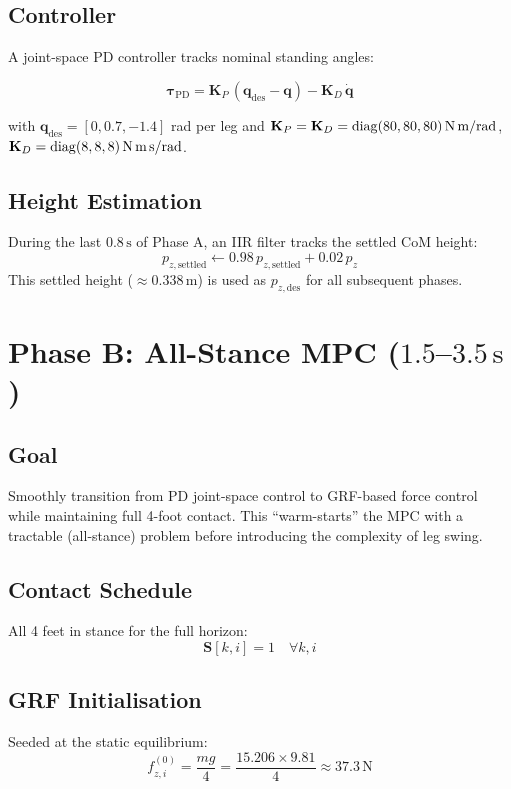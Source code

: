 \documentclass[12pt,a4paper]{report}
\newcommand{\vect}[1]{\bm{#1}}
\newcommand{\mat}[1]{\mathbf{#1}}
\DeclareMathOperator{\diag}{diag}
\begin{document}
\subsection{Controller}
A joint-space PD controller tracks nominal standing angles:

\begin{equation}
    \vect{\tau}_\text{PD} = \mat{K}_P\,(\vect{q}_\text{des} - \vect{q}) -
    \mat{K}_D\,\dot{\vect{q}}
\end{equation}

with $\vect{q}_\text{des} = [0, 0.7, -1.4]$ rad per leg and
$\mat{K}_P = \mat{K}_D = \diag(80, 80, 80)\,\text{N\,m/rad}$,
$\mat{K}_D = \diag(8, 8, 8)\,\text{N\,m\,s/rad}$.

\subsection{Height Estimation}
During the last $0.8\,\text{s}$ of Phase A, an IIR filter tracks the settled
CoM height:
\begin{equation}
    p_{z,\text{settled}} \leftarrow 0.98\,p_{z,\text{settled}} + 0.02\,p_z
\end{equation}
This settled height ($\approx 0.338\,\text{m}$) is used as $p_{z,\text{des}}$
for all subsequent phases.

\section{Phase B: All-Stance MPC ($1.5$--$3.5\,\text{s}$)}

\subsection{Goal}
Smoothly transition from PD joint-space control to GRF-based force control
while maintaining full 4-foot contact.  This ``warm-starts'' the MPC with
a tractable (all-stance) problem before introducing the complexity of leg swing.

\subsection{Contact Schedule}
All 4 feet in stance for the full horizon:
\begin{equation}
    \mat{S}[k, i] = 1 \quad \forall k, i
\end{equation}

\subsection{GRF Initialisation}
Seeded at the static equilibrium:
\begin{equation}
    f_{z,i}^{(0)} = \frac{mg}{4} = \frac{15.206 \times 9.81}{4} \approx 37.3\,\text{N}
\end{equation}
\end{document}
